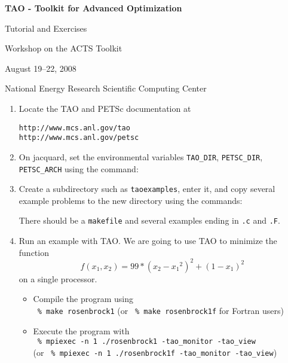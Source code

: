 \documentclass[11pt]{article}
\begin{document}
\begin{center}
{\bf
TAO - Toolkit for Advanced Optimization
        
Tutorial and Exercises

\vspace{0.25in}

Workshop on the ACTS Toolkit

August 19--22, 2008

National Energy Research Scientific Computing Center
}
\end{center}
\vspace{0.25in}

\begin{enumerate}

\item Locate the TAO and PETSc documentation at 
\begin{alltt}
http://www.mcs.anl.gov/tao
http://www.mcs.anl.gov/petsc
\end{alltt}

\item On jacquard, set the environmental variables
\texttt{TAO\_DIR}, \texttt{PETSC\_DIR}, \texttt{PETSC\_ARCH} 
using the command:
\begin{alltt}
% module load tao/1.9_g_c++
\end{alltt}

\item Create a subdirectory such as \texttt{taoexamples}, enter it, and copy several example problems to the new directory using the commands:
\begin{alltt}
% mkdir taoexamples
% cd taoexamples
% cp -R \$TAO_DIR/src/unconstrained/examples/tutorials/* .
% ls
\end{alltt}
There should be a \texttt{makefile} and several examples ending in \texttt{.c} and \texttt{.F}.

\item Run an example with TAO.
We are going to use TAO to minimize the function 
\[
    f(x_1,x_2) = 99*(x_2-{x_1}^2)^2 + (1-x_1)^2 
\]
on a single processor.
\begin{itemize}

 \item Compile the program using \\
  \quad \texttt{ \% make rosenbrock1} 
  (or \texttt{ \% make rosenbrock1f} for Fortran users)

 \item Execute the program with \\
  \quad \texttt{ \% mpiexec -n 1 ./rosenbrock1 -tao\_monitor -tao\_view} \\
  (or \texttt{ \% mpiexec -n 1 ./rosenbrock1f -tao\_monitor -tao\_view}) \\


\end{itemize}
\end{enumerate}
\end{document}
